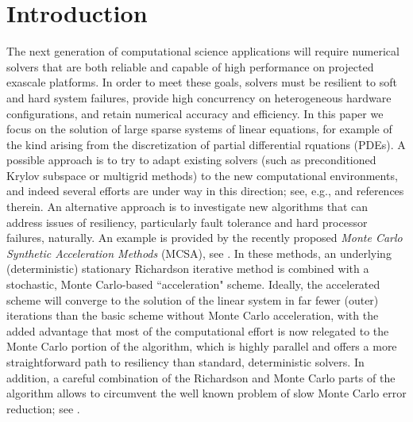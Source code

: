 \documentclass[times]{nlaauth}
\begin{document}

\maketitle



\section{Introduction}
\label{sec:intro}

The next generation of computational science applications will require numerical
solvers that are both reliable and capable of high performance on projected exascale
platforms. In order to meet these goals, solvers must be resilient to soft and hard
system failures, provide high concurrency on heterogeneous hardware configurations,
and retain numerical accuracy and efficiency. In this paper we focus on the
solution of large sparse systems of linear equations, for
example of the kind arising from the discretization of partial differential
rquations (PDEs).  A possible approach is to try to adapt existing solvers
(such as preconditioned Krylov subspace or multigrid methods) to the new
computational environments, and indeed several efforts are under way in this
direction; see, e.g., \cite{Agullo,FLRU15,Heroux,Rizzi,Stoyanov} and references therein.
An alternative approach is to investigate
new algorithms that can address issues of resiliency, particularly fault
tolerance and hard processor failures, naturally. An example is provided
by the recently proposed {\em Monte Carlo Synthetic Acceleration Methods}
(MCSA), see \cite{EMSH2014,Slattery2013}.
In these methods, an underlying (deterministic) stationary Richardson iterative
method is combined with a stochastic, Monte Carlo-based ``acceleration" scheme.
Ideally, the accelerated scheme will converge to the solution of the linear
system in far fewer (outer) iterations than the basic scheme without Monte Carlo
acceleration, with the added advantage that most of the computational effort
is now relegated to the Monte Carlo portion of the algorithm, which is
highly parallel and offers a more straightforward path to resiliency
than standard, deterministic solvers. In addition,
a careful combination of the Richardson
and Monte Carlo parts of the algorithm allows to circumvent the well known
problem of slow Monte Carlo error reduction; see \cite{EMSH2014}.
\end{document}
